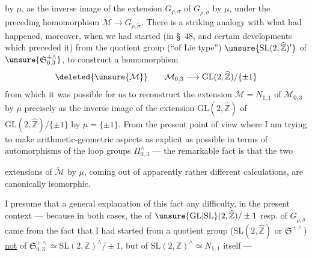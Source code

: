 

by $\mu$, as the inverse image of the extension $G_{\rho,\sigma}$ of $G_{\rho,\widetilde\sigma}$ by $\mu$, under the preceding homomorphism $\widetilde{\mathcal M}\to G_{\rho,\widetilde\sigma}$. There is a striking analogy with what had happened, moreover, when we had started  (in \S~48, and  certain developments which preceded it) from the quotient group (``of Lie type'') $\unsure{\mathrm{SL}(2,\widehat{\mathbb Z})'}$ of $\unsure{\mathfrak S_{0,3}^{+\wedge}}$, to construct a homomorphism
\[
\deleted{\unsure{\mathcal M}}\qquad \mathcal M_{0,3}\longrightarrow\mathrm{GL}(2,\widehat{\mathbb Z})/\{\pm1\}
\]
from which it was possible for us to reconstruct  the extension $\mathcal M=N_{1,1}$ of $\mathcal M_{0,3}$ by $\mu$ precisely as the inverse image of the extension $\mathrm{GL}(2,\widehat{\mathbb Z})$ of $\mathrm{GL}(2,\widehat{\mathbb Z})/\{\pm1\}$ by $\mu=\{\pm1\}$. From the present point of view where I am trying to make arithmetic-geometric aspects as explicit as possible in terms of automorphisms of the  loop groups $\Pi_{0,3}^\wedge$ --- the remarkable fact is that the two



extensions of $\widetilde{\mathcal M}$ by $\mu$, coming out of apparently rather different calculations, are canonically isomorphic.

I presume that a general explanation of this fact  any difficulty, in the present context --- because in both cases, the  of $\unsure{\mathrm{GL}|\mathrm{SL}}(2,\widehat{\mathbb Z})/\pm1$ resp. of $G_{\rho,\widetilde\sigma}$ came from the fact that I had started from a quotient group ($\mathrm{SL}(2,\widehat{\mathbb Z})$ or $\mathfrak S^{+\wedge}$) \uline{not} of $\mathfrak S_{0,3}^{+\wedge}\simeq\mathrm{SL}(2,\mathbb Z)^\wedge/\pm1$, but of $\mathrm{SL}(2,\mathbb Z)^\wedge\simeq N_{1,1}$ itself ---

